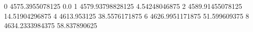 0 4575.3955078125 0.0
1 4579.93798828125 4.54248046875
2 4589.91455078125 14.51904296875
4 4613.953125 38.5576171875
6 4626.9951171875 51.599609375
8 4634.2333984375 58.837890625
